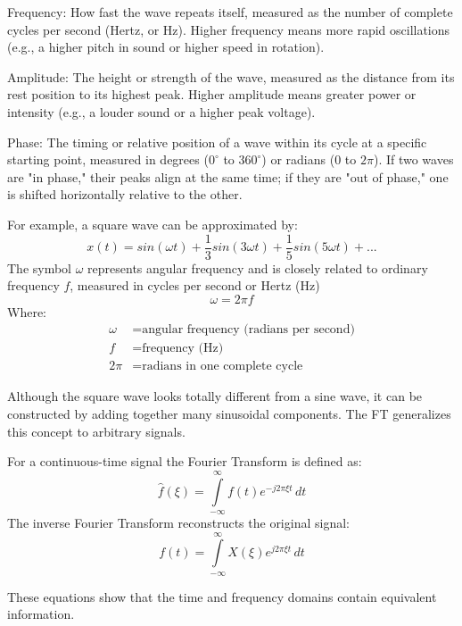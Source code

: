 \begin{compactitem}
    \item Frequency: How fast the wave repeats itself, measured as the number of complete cycles per second (Hertz, or Hz). Higher frequency means more rapid oscillations (e.g., a higher pitch in sound or higher speed in rotation).
    \item Amplitude: The height or strength of the wave, measured as the distance from its rest position to its highest peak. Higher amplitude means greater power or intensity (e.g., a louder sound or a higher peak voltage).
    \item Phase: The timing or relative position of a wave within its cycle at a specific starting point, measured in degrees ($0^\circ$  to $360^\circ$) or radians (0 to $2\pi$). If two waves are "in phase," their peaks align at the same time; if they are "out of phase," one is shifted horizontally relative to the other.
\end{compactitem}

For example, a square wave can be approximated by:
\[
    x(t)=sin(\omega t) + \frac{1}{3} sin(3\omega t) + \frac{1}{5}sin(5\omega t) + ...
\]
The symbol $\omega$ represents angular frequency and is closely related to ordinary frequency $f$, measured in cycles per second or Hertz (Hz)
\[
    \omega=2\pi f
\]
Where:
\[
\begin{aligned}
    \omega &= \text{angular frequency (radians per second)}  \\
    f &= \text{frequency (Hz)} \\
    2\pi &= \text{radians in one complete cycle}
\end{aligned}
\]

Although the square wave looks totally different from a sine wave, it can be constructed by adding together many sinusoidal components. The FT generalizes this concept to arbitrary signals.

For a continuous-time signal the Fourier Transform is defined as:
\[
    \hat{f}(\xi)=\int\limits_{-\infty}^\infty f (t) e^{-j2\pi \xi t}\,dt
\]
The inverse Fourier Transform reconstructs the original signal:
\[
    f(t)=\int\limits_{-\infty}^\infty X (\xi) e^{j2\pi \xi t}\,dt
\]

These equations show that the time and frequency domains contain equivalent information.

